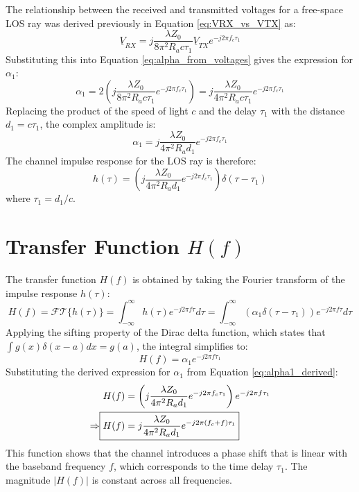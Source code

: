 The relationship between the received and transmitted voltages for a free-space LOS ray was derived previously in Equation \eqref{eq:VRX_vs_VTX} as:
\begin{equation}
	\underline{V}_{RX} = j \frac{\lambda Z_0}{8\pi^2 R_a c\tau_1} \underline{V}_{TX} e^{-j2\pi f_c \tau_1}
\end{equation}
Substituting this into Equation \eqref{eq:alpha_from_voltages} gives the expression for $\alpha_1$:
\begin{equation}
	\alpha_1 = 2 \left( j \frac{\lambda Z_0}{8\pi^2 R_a c\tau_1} e^{-j2\pi f_c \tau_1} \right) = j \frac{\lambda Z_0}{4\pi^2 R_a c\tau_1} e^{-j2\pi f_c \tau_1}
\end{equation}
Replacing the product of the speed of light $c$ and the delay $\tau_1$ with the distance $d_1 = c\tau_1$, the complex amplitude is:
\begin{equation}
	\alpha_1 = j \frac{\lambda Z_0}{4\pi^2 R_a d_1} e^{-j2\pi f_c \tau_1}
	\label{eq:alpha1_derived}
\end{equation}
The channel impulse response for the LOS ray is therefore:
\begin{equation}
	\boxed{h(\tau) = \left( j \frac{\lambda Z_0}{4\pi^2 R_a d_1} e^{-j2\pi f_c \tau_1} \right) \delta(\tau - \tau_1)}
	\label{eq:los_impulse_response_derived_detailed}
\end{equation}
where $\tau_1 = d_1/c$.

\section{Transfer Function $H(f)$}
The transfer function $H(f)$ is obtained by taking the Fourier transform of the impulse response $h(\tau)$:
\begin{equation}
	H(f) = \mathcal{FT}\{ h(\tau)\} =  \int_{-\infty}^{\infty} h(\tau) e^{-j2\pi f \tau} d\tau = \int_{-\infty}^{\infty} \left( \alpha_1 \delta(\tau - \tau_1) \right) e^{-j2\pi f \tau} d\tau
\end{equation}
Applying the sifting property of the Dirac delta function, which states that $\int g(x)\delta(x-a)dx = g(a)$, the integral simplifies to:
\begin{equation}
	H(f) = \alpha_1 e^{-j2\pi f \tau_1}
\end{equation}
Substituting the derived expression for $\alpha_1$ from Equation \eqref{eq:alpha1_derived}:
\begin{align}
	H(f) &= \left( j \frac{\lambda Z_0}{4\pi^2 R_a d_1} e^{-j2\pi f_c \tau_1} \right) e^{-j2\pi f \tau_1} \\
	\Rightarrow \Aboxed{H(f) &= j \frac{\lambda Z_0}{4\pi^2 R_a d_1} e^{-j2\pi (f_c + f) \tau_1}}
	\label{eq:los_transfer_function_detailed}
\end{align}
This function shows that the channel introduces a phase shift that is linear with the baseband frequency $f$, which corresponds to the time delay $\tau_1$. The magnitude $|H(f)|$ is constant across all frequencies.

